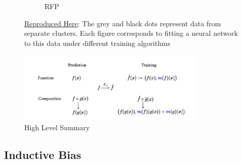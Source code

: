 \documentclass[a4paper,12pt]{article}
\begin{document}
\begin{figure}[htbp]
\begin{subfigure}{.32\textwidth}
        \caption{RFP}
    \label{fig:rfp}
\end{subfigure}
\caption{ \href{https://github.com/pharringtonp19/rfp/blob/main/notebooks/grad_desc_toy.ipynb}{Reproduced Here}: The grey and black dots represent data from separate clusters. Each figure corresponds to fitting a neural network to this data under different training algorithms}
\label{fig:mamlablation}
\end{figure}

\begin{figure}[htbp]
\centering
\includegraphics[width=0.8\textwidth]{figures/framework/cat.png}
        \caption{High Level Summary}
        \label{fig:hls}
\end{figure}
\subsection{Inductive Bias}
\label{subsec:ib}
\end{document}
